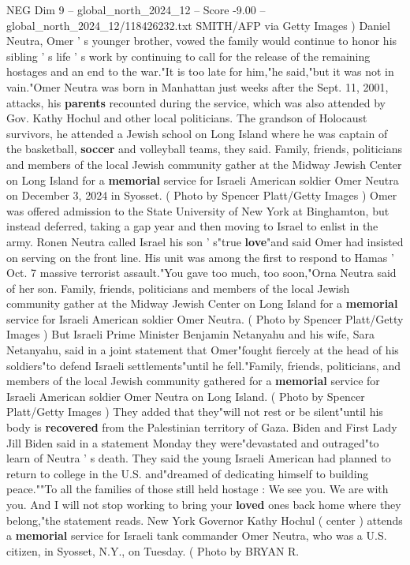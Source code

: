 \begin{textsample}{NEG Dim 9 – global\_north\_2024\_12 – Score -9.00 – global\_north\_2024\_12/118426232.txt}
SMITH/AFP via Getty Images ) Daniel Neutra, Omer ' s younger brother, vowed the family would continue to honor his sibling ' s life ' s work by continuing to call for the release of the remaining hostages and an end to the war."It is too late for him,"he said,"but it was not in vain."Omer Neutra was born in Manhattan just weeks after the Sept. 11, 2001, attacks, his \textbf{parents} recounted during the service, which was also attended by Gov.
Kathy Hochul and other local politicians.
The grandson of Holocaust survivors, he attended a Jewish school on Long Island where he was captain of the basketball, \textbf{soccer} and volleyball teams, they said.
Family, friends, politicians and members of the local Jewish community gather at the Midway Jewish Center on Long Island for a \textbf{memorial} service for Israeli American soldier Omer Neutra on December 3, 2024 in Syosset. ( Photo by Spencer Platt/Getty Images ) Omer was offered admission to the State University of New York at Binghamton, but instead deferred, taking a gap year and then moving to Israel to enlist in the army.
Ronen Neutra called Israel his son ' s"true \textbf{love}"and said Omer had insisted on serving on the front line.
His unit was among the first to respond to Hamas ' Oct. 7 massive terrorist assault."You gave too much, too soon,"Orna Neutra said of her son.
Family, friends, politicians and members of the local Jewish community gather at the Midway Jewish Center on Long Island for a \textbf{memorial} service for Israeli American soldier Omer Neutra. ( Photo by Spencer Platt/Getty Images ) But Israeli Prime Minister Benjamin Netanyahu and his wife, Sara Netanyahu, said in a joint statement that Omer"fought fiercely at the head of his soldiers"to defend Israeli settlements"until he fell."Family, friends, politicians, and members of the local Jewish community gathered for a \textbf{memorial} service for Israeli American soldier Omer Neutra on Long Island. ( Photo by Spencer Platt/Getty Images ) They added that they"will not rest or be silent"until his body is \textbf{recovered} from the Palestinian territory of Gaza.
Biden and First Lady Jill Biden said in a statement Monday they were"devastated and outraged"to learn of Neutra ' s death.
They said the young Israeli American had planned to return to college in the U.S. and"dreamed of dedicating himself to building peace.""To all the families of those still held hostage : We see you.
We are with you.
And I will not stop working to bring your \textbf{loved} ones back home where they belong,"the statement reads.
New York Governor Kathy Hochul ( center ) attends a \textbf{memorial} service for Israeli tank commander Omer Neutra, who was a U.S. citizen, in Syosset, N.Y., on Tuesday. ( Photo by BRYAN R.

\end{textsample}
